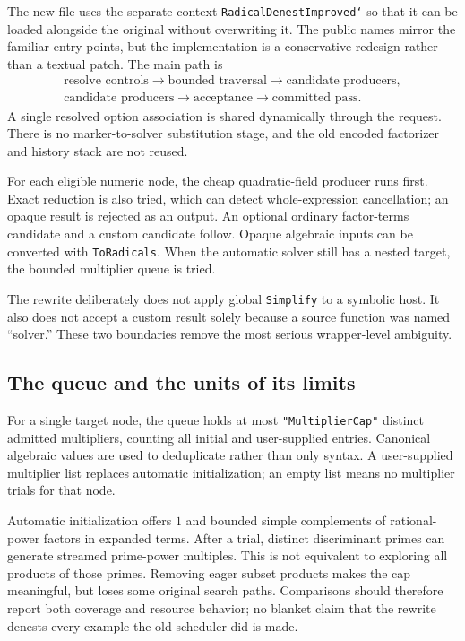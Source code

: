 \documentclass[11pt,letterpaper]{article}
\newcommand{\code}[1]{\texttt{#1}}
\theoremstyle{definition}
\begin{document}
The new file uses the separate context \code{RadicalDenestImproved`} so that it can be loaded alongside the original without overwriting it. The public names mirror the familiar entry points, but the implementation is a conservative redesign rather than a textual patch. The main path is
\begin{gather*}
 \text{resolve controls}\longrightarrow\text{bounded traversal}\longrightarrow\text{candidate producers},\\
 \text{candidate producers}\longrightarrow\text{acceptance}\longrightarrow\text{committed pass}.
\end{gather*}
A single resolved option association is shared dynamically through the request. There is no marker-to-solver substitution stage, and the old encoded factorizer and history stack are not reused.

For each eligible numeric node, the cheap quadratic-field producer runs first. Exact reduction is also tried, which can detect whole-expression cancellation; an opaque result is rejected as an output. An optional ordinary factor-terms candidate and a custom candidate follow. Opaque algebraic inputs can be converted with \code{ToRadicals}. When the automatic solver still has a nested target, the bounded multiplier queue is tried.

The rewrite deliberately does not apply global \code{Simplify} to a symbolic host. It also does not accept a custom result solely because a source function was named ``solver.'' These two boundaries remove the most serious wrapper-level ambiguity.

\subsection{The queue and the units of its limits}

For a single target node, the queue holds at most \code{"MultiplierCap"} distinct admitted multipliers, counting all initial and user-supplied entries. Canonical algebraic values are used to deduplicate rather than only syntax. A user-supplied multiplier list replaces automatic initialization; an empty list means no multiplier trials for that node.

Automatic initialization offers $1$ and bounded simple complements of rational-power factors in expanded terms. After a trial, distinct discriminant primes can generate streamed prime-power multiples. This is not equivalent to exploring all products of those primes. Removing eager subset products makes the cap meaningful, but loses some original search paths. Comparisons should therefore report both coverage and resource behavior; no blanket claim that the rewrite denests every example the old scheduler did is made.
\end{document}
